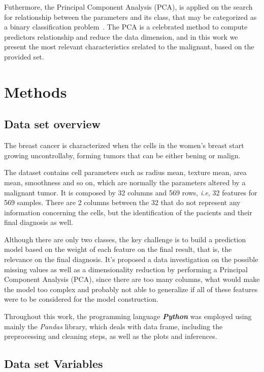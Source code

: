 \documentclass[conference]{IEEEtran}
\begin{document}
Futhermore, the Principal Component Analysis (PCA), is applied on the search for relationship between the parameters and its class, that may be categorized as a binary classification problem~\cite{Abdi2010}. The PCA is a celebrated method to compute predictors relationship and reduce the data dimension, and in this work we present the most relevant characteristics srelated to the malignant, based on the provided set.

\section{Methods}

\subsection{Data set overview}

The breast cancer is characterized when the cells in the women's breast start
growing uncontrollaby, forming tumors that can be either bening or malign. 

The dataset contains cell parameters such as radius mean, texture mean, area mean, 
smoothness and so on, which are normally the parameters altered by a malignant
tumor. 
It is composed by 32 columns and 569 rows, \textit{i.e}, 32 features 
for 569 samples. There are 2 columns between the 32 that do not represent any 
information concerning the cells, but the identification of the pacients and 
their final diagnosis as well. 

Although there are only two classes, the key challenge is to build a prediction
model based on the weight of each feature on the final result, that is, the relevance
on the final diagnosis. It's proposed a data investigation on the possible missing values as 
well as a dimensionality reduction by performing a Principal Component Analysis (PCA), 
since there are too many columns, what would make the model too complex and probably not able 
to generalize if all of these features were to be considered for the model construction. 

Throughout this work, the programming language \textit{\textbf{Python}} was employed 
using mainly the \textit{Pandas} library, which deals with data frame, including the 
preprocessing and cleaning steps, as well as the plots and inferences. 


\subsection{Data set Variables}
\end{document}
